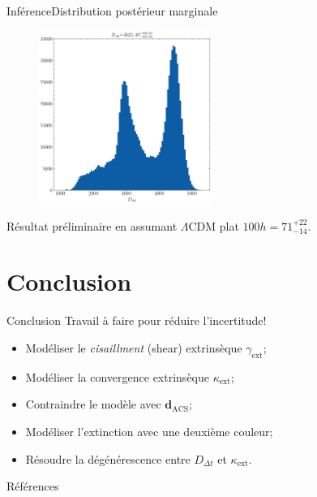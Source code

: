 \documentclass{beamer}
\begin{document}
\begin{frame}{Inférence}{Distribution postérieur marginale}
        \begin{figure}[H]
                \centering
                \includegraphics[width=0.5\textwidth]{marginalized_posterior_Ddt}
        \end{figure}
        Résultat préliminaire en assumant $\Lambda$CDM plat $\boxed{100h = 71^{+22}_{-14}}$.
\end{frame}


\section{Conclusion}
\begin{frame}{Conclusion}
        Travail à faire pour réduire l'incertitude!
        \begin{itemize}
                \item Modéliser le \textit{cisaillment} (shear) extrinsèque $\gamma_{\text{ext}}$;
                \item Modéliser la convergence extrinsèque $\kappa_{\text{ext}}$;
                \item Contraindre le modèle avec $\mathbf{d}_{\text{ACS}}$;
                \item Modéliser l'extinction avec une deuxième couleur;
                \item Résoudre la dégénérescence entre $D_{\Delta t}$ et $\kappa_{\text{ext}}$.
        \end{itemize}
        
\end{frame}


\begin{frame}[allowframebreaks]{Références}
        
        
\end{frame}
\end{document}

